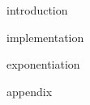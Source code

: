 \documentclass{article}
\begin{document}




\mainmatter

{introduction}

{implementation}

{exponentiation}


\newpage
\printbibliography[heading = bibintoc, title = Bibliography]    %

\addappendix
{appendix}

\end{document}
